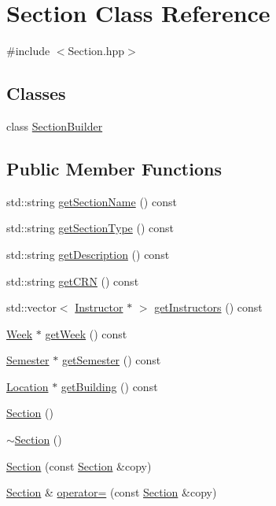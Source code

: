 \hypertarget{class_section}{}\section{Section Class Reference}
\label{class_section}


{\ttfamily \#include $<$Section.\+hpp$>$}

\subsection*{Classes}
\begin{DoxyCompactItemize}
\item 
class \hyperlink{class_section_1_1_section_builder}{Section\+Builder}
\end{DoxyCompactItemize}
\subsection*{Public Member Functions}
\begin{DoxyCompactItemize}
\item 
std\+::string \hyperlink{class_section_aecabf4f89a2004e17897aac4cc67e65e}{get\+Section\+Name} () const 
\item 
std\+::string \hyperlink{class_section_a790e810556eef9b91ab56b2010675ade}{get\+Section\+Type} () const 
\item 
std\+::string \hyperlink{class_section_af6211361e7b9f336e47cfbdf798b67a9}{get\+Description} () const 
\item 
std\+::string \hyperlink{class_section_a081c3a3ff3d6a771fabc43a1d1c27b82}{get\+C\+R\+N} () const 
\item 
std\+::vector$<$ \hyperlink{class_instructor}{Instructor} $\ast$ $>$ \hyperlink{class_section_ac8dcb10edc7a83267ab2b4a3ceb7e452}{get\+Instructors} () const 
\item 
\hyperlink{class_week}{Week} $\ast$ \hyperlink{class_section_ab040a0e3df135e744bb982f4b03983cf}{get\+Week} () const 
\item 
\hyperlink{class_semester}{Semester} $\ast$ \hyperlink{class_section_a87ba19863cdb3df98f8ce2272d0163f3}{get\+Semester} () const 
\item 
\hyperlink{class_location}{Location} $\ast$ \hyperlink{class_section_a606643e47b120ff9ec2c2ae3b3cf87e3}{get\+Building} () const 
\item 
\hyperlink{class_section_a77b88e06692841ba49559d22a25a09f9}{Section} ()
\item 
\hyperlink{class_section_ae2582a77c7ecb8cbd4a1b58e7ad3296e}{$\sim$\+Section} ()
\item 
\hyperlink{class_section_aa4bcd5f0316be0ba936d2b97f28d9e88}{Section} (const \hyperlink{class_section}{Section} \&copy)
\item 
\hyperlink{class_section}{Section} \& \hyperlink{class_section_ab502a434aebeca2501a45a3793b45c53}{operator=} (const \hyperlink{class_section}{Section} \&copy)
\end{DoxyCompactItemize}
